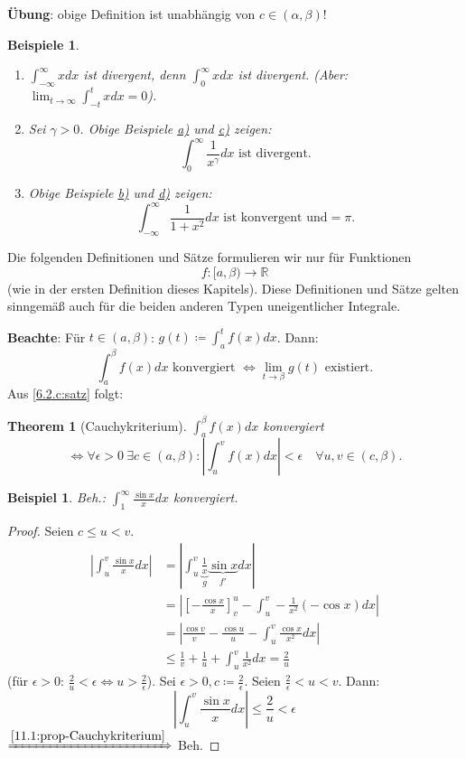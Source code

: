 \documentclass[titlepage,ngerman,a4paper,headsepline]{scrartcl}
\newcommand{\R}{\mathbb{R}}
\theoremstyle{named}
\newtheorem{namedtheorem}{Theorem} \counterwithin{namedtheorem}{section}
\theoremstyle{dotless}
\newtheorem*{beispiel*}{Beispiel}
\newtheorem*{beispiele}{Beispiele}
\begin{document}
\textbf{Übung}: obige Definition ist unabhängig von $c \in (\alpha, \beta)$!

\begin{beispiele} ~\
	\begin{enumerate}
		\item $\int_{-\infty}^{\infty} x dx$ ist divergent, denn $\int_{0}^{\infty} x dx$ ist divergent. (Aber: $\lim_{t \rightarrow \infty} \int_{-t}^{t} x dx = 0$).
		\item Sei $\gamma > 0$. Obige Beispiele \hyperref[11.0:bsp-obigeBspa]{a)} und \hyperref[11.0:bsp-obigeBspc]{c)} zeigen:
			$$ \int_{0}^{\infty} \frac{1}{x^{\gamma}} dx \text{ ist divergent.} $$
		\item Obige Beispiele \hyperref[11.0:bsp-obigeBspb]{b)} und \hyperref[11.0:bsp-obigeBspd]{d)} zeigen:
			$$ \int_{-\infty}^{\infty} \frac{1}{1 + x^{2}} dx \text{ ist konvergent und} = \pi. $$
	\end{enumerate}
\end{beispiele}

Die folgenden Definitionen und Sätze formulieren wir nur für Funktionen 
	$$ f \colon [a, \beta) \rightarrow \R $$
(wie in der ersten Definition dieses Kapitels). Diese Definitionen und Sätze gelten sinngemä{\ss} auch für die beiden anderen Typen uneigentlicher Integrale.

\textbf{Beachte}: Für $t \in (a, \beta)$: $g(t) \coloneqq \int_{a}^{t} f(x) dx$. Dann:
	$$ \int_{a}^{\beta} f(x) dx \text{ konvergiert } \iff \lim_{t \rightarrow \beta} g(t) \text{ existiert.} $$
Aus \ref{6.2.c:satz} folgt:

\begin{namedtheorem}[Cauchykriterium] \label{11.1:prop-Cauchykriterium}
	$\int_{a}^{\beta} f(x) dx$ konvergiert
	$$ \iff \forall \epsilon > 0 ~\exists c \in (a, \beta):  | \int_{u}^{v} f(x) dx | < \epsilon \quad \forall u, v \in (c, \beta).  $$
\end{namedtheorem}


\begin{beispiel*}
	Beh.: $\int_{1}^{\infty} \frac{\sin x}{x} dx$ konvergiert.	
\end{beispiel*}

\begin{proof}
	Seien $c \leq u < v$.
	\begin{align*}
		|\int_{u}^{v} \frac{\sin x}{x} dx | & = | \int_{u}^{v} \underbrace{\frac{1}{x}}_{g} \underbrace{\sin x}_{f'} dx | \\
			& = | \left[ -\frac{\cos x}{x} \right]_{v}^{u} - \int_{u}^{v} - \frac{1}{x^{2}} (-\cos x) dx | \\
			& = | \frac{\cos v}{v} - \frac{\cos u}{u} - \int_{u}^{v} \frac{\cos x}{x^{2}} dx | \\
			& \leq \frac{1}{v} + \frac{1}{u} + \int_{u}^{v} \frac{1}{x^{2}} dx = \frac{2}{u}
	\end{align*}
	(für $\epsilon > 0$: $\frac{2}{u} < \epsilon \iff u > \frac{2}{\epsilon}$). Sei $\epsilon > 0, c \coloneqq \frac{2}{\epsilon}$. Seien $\frac{2}{\epsilon} < u < v$. Dann:
	$$ | \int_{u}^{v} \frac{\sin x}{x} dx | \leq \frac{2}{u} < \epsilon $$
	$\xRightarrow[]{\ref{11.1:prop-Cauchykriterium}}$ Beh.
\end{proof}
\end{document}
